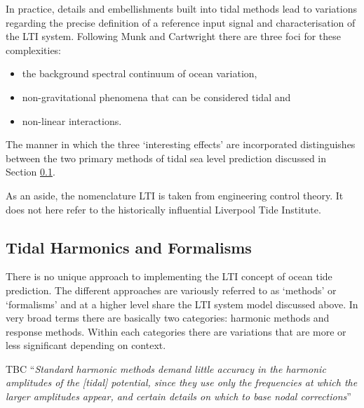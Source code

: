 In practice, details and embellishments built into tidal methods lead to variations regarding the precise definition of a reference input signal and characterisation of the LTI system.   Following Munk and Cartwright \citep{Munk:1966ts} there are three foci for these complexities:
\begin{itemize}
\item the background spectral continuum of ocean variation, 
\item non-gravitational phenomena that can be considered tidal and 
\item non-linear interactions.   
\end{itemize}
The manner in which the three `interesting effects' are incorporated distinguishes between the two primary methods of tidal sea level prediction discussed in Section \ref{S:formalisms}.



As an aside, the nomenclature LTI is taken from engineering control theory.   It does not here refer to the historically influential Liverpool Tide Institute.


\subsection{Tidal Harmonics and Formalisms}
\label{S:formalisms}

There is no unique approach to implementing the LTI concept of ocean tide prediction.   The different approaches are variously referred to as `methods' or `formalisms' and at a higher level share the LTI system model discussed above.  In very broad terms there are basically two categories: harmonic methods and response methods.   Within each categories there are variations that are more or less significant depending on context. 

TBC
``\textit{Standard harmonic methods demand little accuracy in the harmonic amplitudes of the [tidal] potential, since they use only the frequencies at which the larger amplitudes appear, and certain details on which to base nodal corrections}''\cite{Cartwright:1973em}

